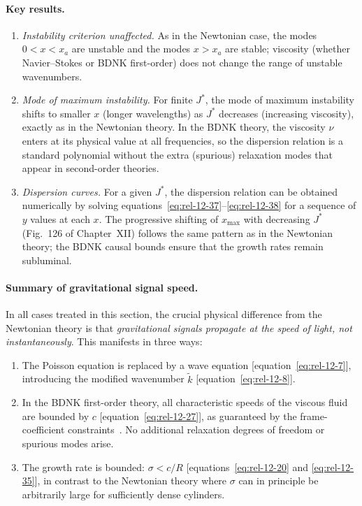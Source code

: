\paragraph{Key results.}
\begin{enumerate}
\item \emph{Instability criterion unaffected.}  As in the Newtonian
  case, the modes $0<x<x_{a}$ are unstable and the modes $x>x_{a}$ are
  stable; viscosity (whether Navier--Stokes or BDNK first-order) does
  not change the range of unstable wavenumbers.

\item \emph{Mode of maximum instability.}  For finite $J^{*}$, the
  mode of maximum instability shifts to smaller $x$ (longer wavelengths)
  as $J^{*}$ decreases (increasing viscosity), exactly as in the
  Newtonian theory.  In the BDNK theory, the viscosity $\nu$ enters at
  its physical value at all frequencies, so the dispersion relation is
  a standard polynomial without the extra (spurious) relaxation modes
  that appear in second-order theories.

\item \emph{Dispersion curves.}  For a given $J^{*}$, the dispersion
  relation can be obtained numerically by solving
  equations~\eqref{eq:rel-12-37}--\eqref{eq:rel-12-38} for a sequence
  of $y$ values at each $x$.  The progressive shifting of
  $x_{\max}$ with decreasing $J^{*}$ (Fig.~126 of Chapter~XII) follows
  the same pattern as in the Newtonian theory; the BDNK causal bounds
  ensure that the growth rates remain subluminal.
\end{enumerate}

\paragraph{Summary of gravitational signal speed.}
In all cases treated in this section, the crucial physical difference
from the Newtonian theory is that \emph{gravitational signals propagate
at the speed of light, not instantaneously}.  This manifests in three
ways:
\begin{enumerate}
\item The Poisson equation is replaced by a wave equation
  [equation~\eqref{eq:rel-12-7}], introducing the modified wavenumber
  $\tilde{k}$ [equation~\eqref{eq:rel-12-8}].
\item In the BDNK first-order theory, all characteristic speeds of
  the viscous fluid are bounded by $c$
  [equation~\eqref{eq:rel-12-27}], as guaranteed by the frame-coefficient
  constraints~\cite{BemficaDNK2023,HoultKovtun2020}.  No additional relaxation
  degrees of freedom or spurious modes arise.
\item The growth rate is bounded: $\sigma < c/R$
  [equations~\eqref{eq:rel-12-20} and \eqref{eq:rel-12-35}], in
  contrast to the Newtonian theory where $\sigma$ can in principle be
  arbitrarily large for sufficiently dense cylinders.
\end{enumerate}

